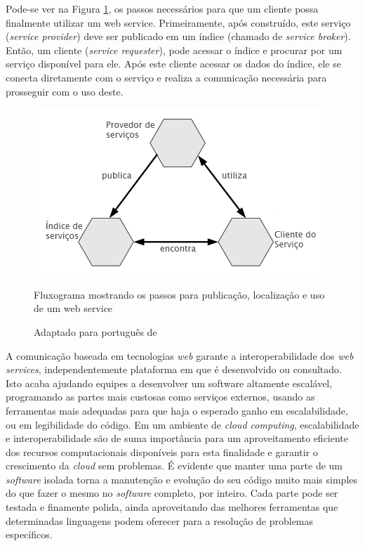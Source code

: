 Pode-se ver na Figura \ref{img:fluxo-webservice}, os passos necessários para que um
cliente possa finalmente utilizar um web service. Primeiramente, após construído, este
serviço (\textit{service provider}) deve ser publicado em um índice (chamado de \textit{service broker}).
Então, um cliente (\textit{service requester}), pode acessar o índice e procurar por um serviço
disponível para ele. Após este cliente acessar os dados do índice, ele se conecta diretamente com o
serviço e realiza a comunicação necessária para prosseguir com o uso deste.

\begin{figure}[h]
  \center
  \includegraphics[scale=0.7]{imagem/fluxo-webservice.png}
  \caption{Fluxograma mostrando os passos para publicação, localização e uso de um web service}
  \caption*{Adaptado para português de }
  \label{img:fluxo-webservice}
\end{figure}

A comunicação baseada em tecnologias \emph{web} garante a interoperabilidade dos \emph{web
services}, independentemente plataforma em que é desenvolvido ou consultado.
Isto acaba ajudando equipes a desenvolver um software altamente escalável,
programando as partes mais custosas como serviços externos, usando as ferramentas
mais adequadas para que haja o esperado ganho em escalabilidade, ou em legibilidade do código.
Em um ambiente de \emph{cloud computing}, escalabilidade e interoperabilidade são
de suma importância para um aproveitamento eficiente dos recursos computacionais
disponíveis para esta finalidade e garantir o crescimento da \emph{cloud} sem problemas.
É evidente que manter uma parte de um \emph{software} isolada torna a manutenção e evolução
do seu código muito mais simples do que fazer o mesmo no \emph{software} completo, por inteiro.
Cada parte pode ser testada e finamente polida, ainda aproveitando das melhores
ferramentas que determinadas linguagens podem oferecer para a resolução de problemas
específicos.
